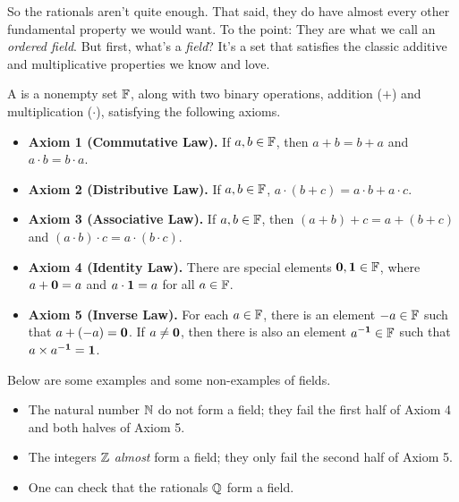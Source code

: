 \begin{remark}
  So the rationals aren't quite enough. That said, they do have
  almost every other fundamental property we would want. To the
  point: They are what we call an \textit{ordered field}. But first,
  what's a \textit{field}? It's a set that satisfies the classic
  additive and multiplicative properties we know and love.
\end{remark}

\begin{definition}[Fields]
  A  is a nonempty set $\mathbb F$, along with two binary
  operations, addition ($+$) and multiplication ($\cdot$), satisfying
  the following axioms.
  \begin{itemize}
    \item \textbf{Axiom 1 (Commutative Law).} If $a, b \in \mathbb F$, then
      $a + b = b + a$ and $a \cdot b = b \cdot a$.
    \item \textbf{Axiom 2 (Distributive Law).} If $a, b \in \mathbb F$, $a
      \cdot (b + c) = a \cdot b + a \cdot c$.
    \item \textbf{Axiom 3 (Associative Law).} If $a, b \in \mathbb F$, then
      $(a + b) + c = a + (b + c)$ and $(a \cdot b) \cdot c = a \cdot
      (b \cdot c)$.
    \item \textbf{Axiom 4 (Identity Law).} There are special elements
      $\textbf{0}, \textbf{1} \in \mathbb F$, where $a + \textbf{0} = a$ and $a \cdot \textbf{1}
      = a$ for all $a \in \mathbb F$.
    \item \textbf{Axiom 5 (Inverse Law).} For each $a \in \mathbb F$, there
      is an element $-a \in \mathbb F$ such that $a + (-a) = \textbf{0}$. If $a
      \neq \textbf{0}$, then there is also an element $a^{-\textbf{1}} \in \mathbb F$
      such that $a \times a^{-\textbf{1}} = \textbf{1}$.
  \end{itemize}
\end{definition}

\begin{example}
  Below are some examples and some non-examples of fields.
  \begin{itemize}
    \item The natural number $\mathbb N$ do not form a field; they fail the
      first half of Axiom 4 and both halves of Axiom 5.
    \item The integers $\mathbb Z$ \textit{almost} form a field; they only
      fail the second half of Axiom 5.
    \item One can check that the rationals $\mathbb Q$ form a field.
  \end{itemize}
\end{example}

